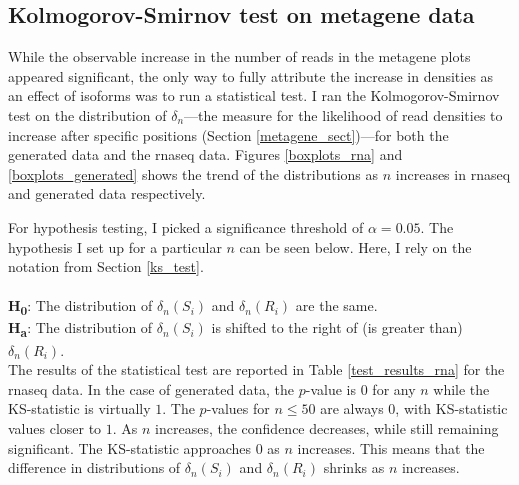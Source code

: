 \documentclass[12pt]{article}
\begin{document}




\subsection{Kolmogorov-Smirnov test on metagene data}

While the observable increase in the number of reads in the metagene plots appeared significant, the only way to fully attribute the increase in densities as an effect of isoforms was to run a statistical test. I ran the Kolmogorov-Smirnov test on the distribution of $\delta_n$---the measure for the likelihood of read densities to increase after specific positions (Section \ref{metagene_sect})---for both the generated data and the \acrshort{rnaseq} data. Figures \ref{boxplots_rna} and \ref{boxplots_generated} shows the trend of the distributions as $n$ increases in \acrshort{rnaseq} and generated data respectively. 


For hypothesis testing, I picked a significance threshold of $\alpha = 0.05$. The hypothesis I set up for a particular $n$ can be seen below. Here, I rely on the notation from Section \ref{ks_test}. \\
\\
\textbf{H\textsubscript{0}}: The distribution of $\delta_n(S_i)$ and $\delta_n(R_i)$ are the same. \\ 
\textbf{H\textsubscript{a}}: The distribution of $\delta_n(S_i)$ is shifted to the right of (is greater than) $\delta_n(R_i)$.\\


The results of the statistical test are reported in Table \ref{test_results_rna} for the \acrshort{rnaseq} data. In the case of generated data, the $p$-value is $0$ for any $n$ while the KS-statistic is virtually $1$. The $p$-values for $n \le 50$ are always $0$, with KS-statistic values closer to $1$.  As $n$ increases, the confidence decreases, while still remaining significant. The KS-statistic approaches $0$ as $n$ increases. This means that the difference in distributions of $\delta_n(S_i)$ and $\delta_n(R_i)$ shrinks as $n$ increases.






\end{document}
